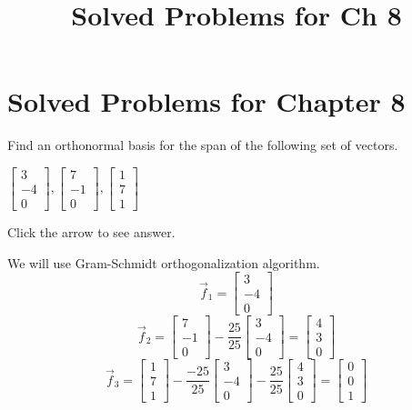\documentclass{ximera}
\title{Solved Problems for Ch 8} \license{CC BY-NC-SA 4.0}
\begin{document}
\begin{abstract}
\end{abstract}
\maketitle

\section*{Solved Problems for Chapter 8}

\begin{problem}\label{prob:orth_basis1}
    Find an orthonormal basis for the span of the following set of
vectors.


$\left[
\begin{array}{r}
 3 \\
-4 \\
0
\end{array}
\right] ,\left[
\begin{array}{r}
 7 \\
-1 \\
0
\end{array}
\right] ,\left[
\begin{array}{r}
 1 \\
7 \\
1
\end{array}
\right] $

Click the arrow to see answer.
\begin{expandable}
We will use Gram-Schmidt orthogonalization algorithm.
$$\vec{f}_1=\begin{bmatrix}3\\-4\\0\end{bmatrix}$$
$$\vec{f}_2=\begin{bmatrix}7\\-1\\0\end{bmatrix}-\frac{25}{25}\begin{bmatrix}3\\-4\\0\end{bmatrix}=\begin{bmatrix}4\\3\\0\end{bmatrix}$$
$$\vec{f}_3=\begin{bmatrix}1\\7\\1\end{bmatrix}-\frac{-25}{25}\begin{bmatrix}3\\-4\\0\end{bmatrix}-\frac{25}{25}\begin{bmatrix}4\\3\\0\end{bmatrix}=\begin{bmatrix}0\\0\\1\end{bmatrix}$$


\end{expandable}
\end{problem}
\end{document}

